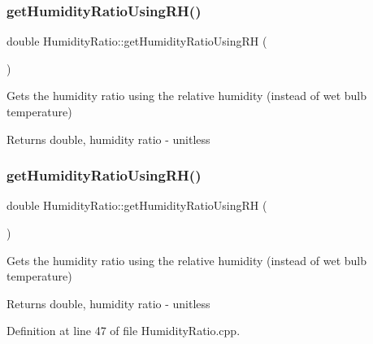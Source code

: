 \subsubsection{\texorpdfstring{get\+Humidity\+Ratio\+Using\+R\+H()}{getHumidityRatioUsingRH()}\hspace{0.1cm}{\footnotesize\ttfamily [1/3]}}
{\footnotesize\ttfamily double Humidity\+Ratio\+::get\+Humidity\+Ratio\+Using\+RH (\begin{DoxyParamCaption}{ }\end{DoxyParamCaption})}

Gets the humidity ratio using the relative humidity (instead of wet bulb temperature)

\begin{DoxyReturn}{Returns}
double, humidity ratio -\/ unitless 
\end{DoxyReturn}
\mbox{\label{class_humidity_ratio_af711463f09fa91544c2b69dc24817fed}} 
\subsubsection{\texorpdfstring{get\+Humidity\+Ratio\+Using\+R\+H()}{getHumidityRatioUsingRH()}\hspace{0.1cm}{\footnotesize\ttfamily [2/3]}}
{\footnotesize\ttfamily double Humidity\+Ratio\+::get\+Humidity\+Ratio\+Using\+RH (\begin{DoxyParamCaption}{ }\end{DoxyParamCaption})}

Gets the humidity ratio using the relative humidity (instead of wet bulb temperature)

\begin{DoxyReturn}{Returns}
double, humidity ratio -\/ unitless 
\end{DoxyReturn}


Definition at line 47 of file Humidity\+Ratio.\+cpp.

\mbox{\label{class_humidity_ratio_af711463f09fa91544c2b69dc24817fed}} 
